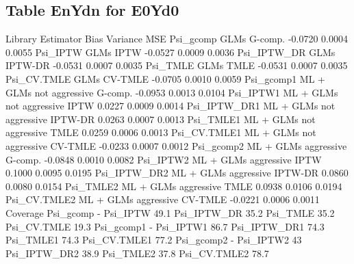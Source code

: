 \documentclass[11pt]{article}
\begin{document}
\subsection{Table EnYdn for E0Yd0}
\begin{Schunk}
\begin{Soutput}
                              Library Estimator    Bias Variance    MSE
Psi_gcomp                        GLMs   G-comp. -0.0720   0.0004 0.0055
Psi_IPTW                         GLMs      IPTW -0.0527   0.0009 0.0036
Psi_IPTW_DR                      GLMs   IPTW-DR -0.0531   0.0007 0.0035
Psi_TMLE                         GLMs      TMLE -0.0531   0.0007 0.0035
Psi_CV.TMLE                      GLMs   CV-TMLE -0.0705   0.0010 0.0059
Psi_gcomp1   ML + GLMs not aggressive   G-comp. -0.0953   0.0013 0.0104
Psi_IPTW1    ML + GLMs not aggressive      IPTW  0.0227   0.0009 0.0014
Psi_IPTW_DR1 ML + GLMs not aggressive   IPTW-DR  0.0263   0.0007 0.0013
Psi_TMLE1    ML + GLMs not aggressive      TMLE  0.0259   0.0006 0.0013
Psi_CV.TMLE1 ML + GLMs not aggressive   CV-TMLE -0.0233   0.0007 0.0012
Psi_gcomp2       ML + GLMs aggressive   G-comp. -0.0848   0.0010 0.0082
Psi_IPTW2        ML + GLMs aggressive      IPTW  0.1000   0.0095 0.0195
Psi_IPTW_DR2     ML + GLMs aggressive   IPTW-DR  0.0860   0.0080 0.0154
Psi_TMLE2        ML + GLMs aggressive      TMLE  0.0938   0.0106 0.0194
Psi_CV.TMLE2     ML + GLMs aggressive   CV-TMLE -0.0221   0.0006 0.0011
             Coverage
Psi_gcomp           -
Psi_IPTW        49.1%
Psi_IPTW_DR     35.2%
Psi_TMLE        35.2%
Psi_CV.TMLE     19.3%
Psi_gcomp1          -
Psi_IPTW1       86.7%
Psi_IPTW_DR1    74.3%
Psi_TMLE1       74.3%
Psi_CV.TMLE1    77.2%
Psi_gcomp2          -
Psi_IPTW2         43%
Psi_IPTW_DR2    38.9%
Psi_TMLE2       37.8%
Psi_CV.TMLE2    78.7%
\end{Soutput}
\end{Schunk}
\end{document}
